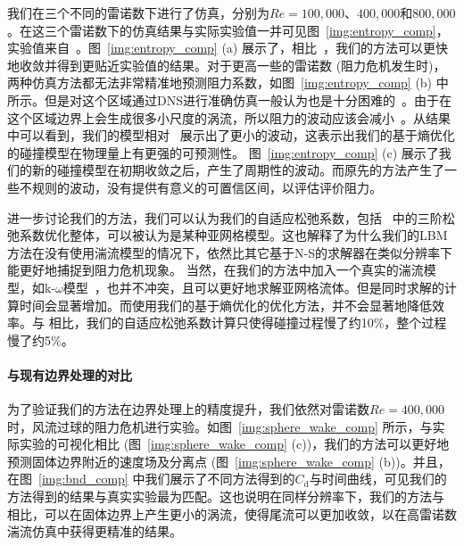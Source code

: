 我们在三个不同的雷诺数下进行了仿真，分别为$Re=100,000$、$400,000$和$800,000$。在这三个雷诺数下的仿真结果与实际实验值一并可见图~\ref{img:entropy_comp}，实验值来自~\cite{Barati-2014}。图~\ref{img:entropy_comp} (a) 展示了，相比~\cite{Geier-2017}，我们的方法可以更快地收敛并得到更贴近实验值的结果。对于更高一些的雷诺数 (阻力危机发生时)，两种仿真方法都无法非常精准地预测阻力系数，如图~\ref{img:entropy_comp} (b) 中所示。但是对这个区域通过DNS进行准确仿真一般认为也是十分困难的~\cite{Tiwari-2020}。由于在这个区域边界上会生成很多小尺度的涡流，所以阻力的波动应该会减小~\cite{Deshpande-2017}。从结果中可以看到，我们的模型相对~\cite{Geier-2017} 展示出了更小的波动，这表示出我们的基于熵优化的碰撞模型在物理量上有更强的可预测性。
图~\ref{img:entropy_comp} (c) 展示了我们的新的碰撞模型在初期收敛之后，产生了周期性的波动。而原先的方法产生了一些不规则的波动，没有提供有意义的可置信区间，以评估评价阻力。

进一步讨论我们的方法，我们可以认为我们的自适应松弛系数，包括~\cite{Geier-2017} 中的三阶松弛系数优化整体，可以被认为是某种亚网格模型。这也解释了为什么我们的LBM方法在没有使用湍流模型的情况下，依然比其它基于N-S的求解器在类似分辨率下能更好地捕捉到阻力危机现象。
当然，在我们的方法中加入一个真实的湍流模型，如k-$\omega$模型~\cite{Menter-1994}，也并不冲突，且可以更好地求解亚网格流体。但是同时求解的计算时间会显著增加。而使用我们的基于熵优化的优化方法，并不会显著地降低效率。与 \cite{Geier-2017} 相比，我们的自适应松弛系数计算只使得碰撞过程慢了约10\%，整个过程慢了约5\%。

\paragraph{与现有边界处理的对比}
为了验证我们的方法在边界处理上的精度提升，我们依然对雷诺数$Re=400,000$时，风流过球的阻力危机进行实验。如图~\ref{img:sphere_wake_comp} 所示，与实际实验的可视化相比 (图~\ref{img:sphere_wake_comp} (c))，我们的方法可以更好地预测固体边界附近的速度场及分离点 (图~\ref{img:sphere_wake_comp} (b))。并且，在图~\ref{img:bnd_comp} 中我们展示了不同方法得到的$C_\text{d}$与时间曲线，可见我们的方法得到的结果与真实实验最为匹配。这也说明在同样分辨率下，我们的方法与~\cite{Tao-2018-b} 相比，可以在固体边界上产生更小的涡流，使得尾流可以更加收敛，以在高雷诺数湍流仿真中获得更精准的结果。

